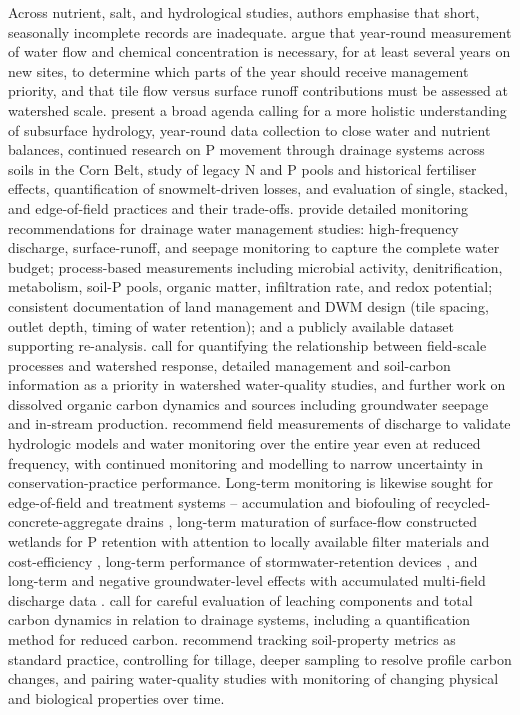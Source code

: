 Across nutrient, salt, and hydrological studies, authors emphasise that short,
seasonally incomplete records are inadequate. \textcite{Kladivko2001} argue that
year-round measurement of water flow and chemical concentration is necessary, for
at least several years on new sites, to determine which parts of the year should
receive management priority, and that tile flow versus surface runoff contributions
must be assessed at watershed scale. \textcite{Sharpley2019} present a broad agenda
calling for a more holistic understanding of subsurface hydrology, year-round data
collection to close water and nutrient balances, continued research on P movement
through drainage systems across soils in the Corn Belt, study of legacy N and P
pools and historical fertiliser effects, quantification of snowmelt-driven losses,
and evaluation of single, stacked, and edge-of-field practices and their
trade-offs. \textcite{Frankenberger2024} provide detailed monitoring
recommendations for drainage water management studies: high-frequency discharge,
surface-runoff, and seepage monitoring to capture the complete water budget;
process-based measurements including microbial activity, denitrification,
metabolism, soil-P pools, organic matter, infiltration rate, and redox potential;
consistent documentation of land management and DWM design (tile spacing, outlet
depth, timing of water retention); and a publicly available dataset supporting
re-analysis. \textcite{Williams2017} call for quantifying the relationship between
field-scale processes and watershed response, detailed management and soil-carbon
information as a priority in watershed water-quality studies, and further work on
dissolved organic carbon dynamics and sources including groundwater seepage and
in-stream production. \textcite{Drake2018} recommend field measurements of
discharge to validate hydrologic models and water monitoring over the entire year
even at reduced frequency, with continued monitoring and modelling to narrow
uncertainty in conservation-practice performance. Long-term monitoring is likewise
sought for edge-of-field and treatment systems -- accumulation and biofouling of
recycled-concrete-aggregate drains \parencite{McCulloch2017}, long-term maturation
of surface-flow constructed wetlands for P retention with attention to locally
available filter materials and cost-efficiency \parencite{Mendes2020}, long-term
performance of stormwater-retention devices \parencite{Xu2022}, and long-term and
negative groundwater-level effects with accumulated multi-field discharge data
\parencite{Okuda2020}. \textcite{Furukawa2008} call for careful evaluation of
leaching components and total carbon dynamics in relation to drainage systems,
including a quantification method for reduced carbon. \textcite{Frankl2023}
recommend tracking soil-property metrics as standard practice, controlling for
tillage, deeper sampling to resolve profile carbon changes, and pairing
water-quality studies with monitoring of changing physical and biological
properties over time.

